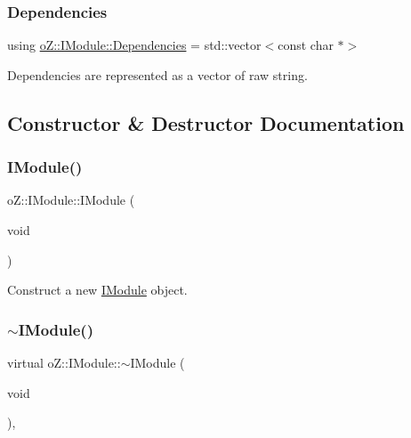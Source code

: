 \subsubsection{\texorpdfstring{Dependencies}{Dependencies}}
{\footnotesize\ttfamily using \mbox{\hyperlink{classo_z_1_1_i_module_ac13210556cb2a65d186bfbe5208c666c}{o\+Z\+::\+I\+Module\+::\+Dependencies}} =  std\+::vector$<$const char $\ast$$>$}



Dependencies are represented as a vector of raw string. 



\subsection{Constructor \& Destructor Documentation}
\mbox{\label{classo_z_1_1_i_module_a21fdd98fb701ae6f7f0e0de14beb72de}} 
\subsubsection{\texorpdfstring{IModule()}{IModule()}}
{\footnotesize\ttfamily o\+Z\+::\+I\+Module\+::\+I\+Module (\begin{DoxyParamCaption}\item[{void}]{ }\end{DoxyParamCaption})\hspace{0.3cm}{\ttfamily [default]}}



Construct a new \mbox{\hyperlink{classo_z_1_1_i_module}{I\+Module}} object. 

\mbox{\label{classo_z_1_1_i_module_a6ac6f3edf9fe885b2510dc01379a951c}} 
\subsubsection{\texorpdfstring{$\sim$IModule()}{~IModule()}}
{\footnotesize\ttfamily virtual o\+Z\+::\+I\+Module\+::$\sim$\+I\+Module (\begin{DoxyParamCaption}\item[{void}]{ }\end{DoxyParamCaption})\hspace{0.3cm}{\ttfamily [virtual]}, {\ttfamily [default]}}



